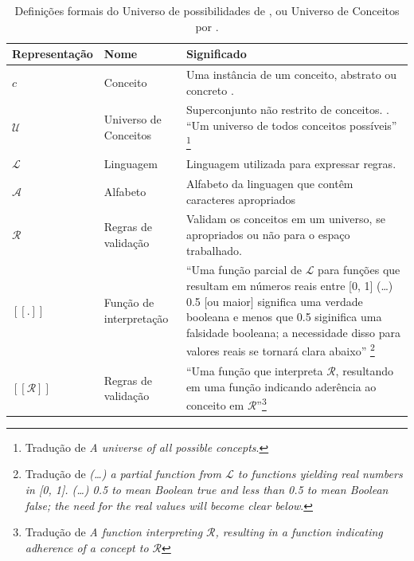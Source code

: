 \begin{table}[!h]
\caption{Definições formais do Universo de possibilidades de , ou Universo de Conceitos por .}
\small
    \begin{tabular}{ | p{4cm} | p{5.5cm} | p{5.5cm} |}
    \hline 
    \hline 

    \tiny{Representação} 
    & \tiny{Nome}      
    & \tiny{Significado} \\
    \hline

    $c$
    & \tiny{Conceito} 
    & \tiny{Uma instância de um conceito, abstrato ou concreto \cite{wiggins_framework_2006}.} \\
    \hline

    $\mathcal{U}$
    & \tiny{Universo de Conceitos} 
    & \tiny{Superconjunto não restrito de conceitos. \cite{wiggins_framework_2006}. ``Um universo de todos conceitos possíveis'' \cite{mclean_music_2006} \footnote{Tradução de \emph{A universe of all possible concepts}.}}\\
    \hline

    $\mathcal{L}$
    & \tiny{Linguagem} 
    & \tiny{Linguagem utilizada para expressar regras.} \\
    \hline

    $\mathcal{A}$
    & \tiny{Alfabeto} 
    & \tiny{Alfabeto da linguagen que contêm caracteres apropriados} \\
    \hline

    $\mathcal{R}$
    & \tiny{Regras de validação} 
    & \tiny{Validam os conceitos em um universo, se apropriados ou não para o espaço trabalhado.} \\
    \hline

    $[[.]]$
    & \tiny{Função de interpretação} 
    & \tiny{``Uma função parcial de $\mathcal{L}$ para funções que resultam em números reais entre [0, 1] (\ldots) 0.5 $[$ou maior$]$ significa uma verdade booleana e menos que 0.5 siginifica uma falsidade booleana; a necessidade disso para valores reais se tornará clara abaixo'' \cite[p.~452]{wiggins_framework_2006}\footnote{Tradução de \emph{(\ldots) a partial function from $\mathcal{L}$ to functions yielding real numbers in [0, 1]. (\ldots) 0.5 to mean Boolean true and less than 0.5 to mean Boolean false; the need for the real values will become clear below}.}}\\
    \hline

     $[[\mathcal{R}]]$
    & \tiny{Regras de validação} 
    & \tiny{``Uma função que interpreta $\mathcal{R}$, resultando em uma função indicando aderência ao conceito em $\mathcal{R}$''\footnote{Tradução de \emph{A function interpreting $\mathcal{R}$, resulting in a function indicating adherence of a concept to $\mathcal{R}$}}} \\
    \hline


\end{tabular}
\end{table}
